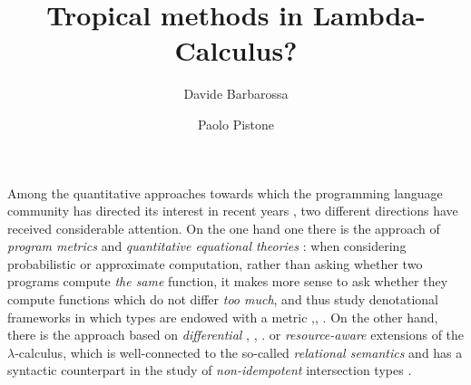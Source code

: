 \documentclass[submission,%
]{eptcs}
\title{Tropical methods in Lambda-Calculus?}
\author{Davide Barbarossa
\institute{DISI, Universit\`a di Bologna}
\email{davide.barbarossa@unibo.it}
\and
\qquad\qquad Paolo Pistone
\institute{\qquad\qquad\qquad DISI, Universit\`a di Bologna}
\email{\qquad\qquad\qquad paolo.pistone@unibo.it}
}
\begin{document}
\maketitle




Among the quantitative approaches towards which the programming language community has directed its interest in recent years%
, two different directions have received considerable attention. 
On the one hand one there is the approach of \emph{program metrics} \cite{Reed2010, Gaboardi2017, Gabo2019} and \emph{quantitative equational theories} \cite{Plotk}: when considering probabilistic or approximate computation, rather than asking whether two programs compute \emph{the same} function, it makes more sense to ask  whether they compute functions which do not differ \emph{too much}, and thus study denotational frameworks in which types are endowed with a metric \cite{Reed2010},\cite{Bonchi2018}, \cite{Geoffroy2020, PistoneLICS, PistoneFSCD2022}.
On the other hand, there is the approach based on \emph{differential} \cite{difflambda}, \cite{difflambda}, \cite{Manzo2013, Breuvart2018, PistoneLICS2022}.  or \emph{resource-aware} \cite{Boudol1993} extensions of the $\lambda$-calculus, which is well-connected to the so-called \emph{relational semantics} \cite{Manzo2012, Manzo2013, dill} and has a syntactic counterpart in the study of \emph{non-idempotent} intersection types \cite{decarvalho2018, Mazza2016}.
\end{document}
